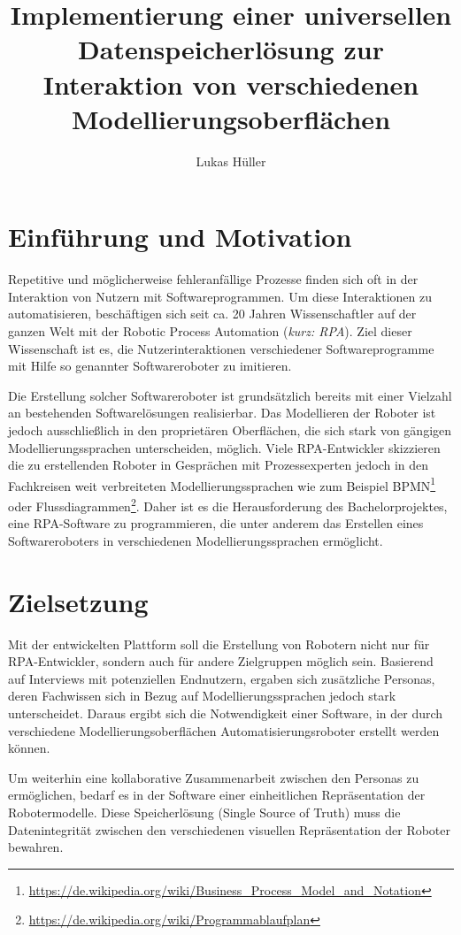 \documentclass[a4paper, ngerman ]{article}
\title{Implementierung einer universellen Datenspeicherlösung zur Interaktion von verschiedenen Modellierungsoberflächen}
\author{Lukas Hüller}
\newcommand{\ssot}{\glqq Single Source of Truth\grqq}
\begin{document}
\maketitle

\section{Einführung und Motivation}

Repetitive und möglicherweise fehleranfällige Prozesse finden sich oft in der Interaktion von Nutzern mit Softwareprogrammen. Um diese Interaktionen zu automatisieren, beschäftigen sich seit ca. 20 Jahren Wissenschaftler auf der ganzen Welt mit der \glqq Robotic Process Automation\grqq{} (\textit{kurz: RPA}). Ziel dieser Wissenschaft ist es, die Nutzerinteraktionen verschiedener Softwareprogramme mit Hilfe so genannter \glqq Softwareroboter\grqq{} zu imitieren.

Die Erstellung solcher Softwareroboter ist grundsätzlich bereits mit einer Vielzahl an bestehenden Softwarelösungen realisierbar. Das Modellieren der Roboter ist jedoch ausschließlich in den pro­p­ri­e­tären Oberflächen, die sich stark von gängigen Modellierungssprachen unterscheiden, möglich. Viele RPA-Entwickler skizzieren die zu erstellenden Roboter in Gesprächen mit Prozessexperten jedoch in den Fachkreisen weit verbreiteten Modellierungssprachen wie zum Beispiel BPMN\footnote{\url{https://de.wikipedia.org/wiki/Business_Process_Model_and_Notation}} oder Flussdiagrammen\footnote{\url{https://de.wikipedia.org/wiki/Programmablaufplan}}. Daher ist es die Herausforderung des Bachelorprojektes, eine RPA-Software zu programmieren, die unter anderem das Erstellen eines Softwareroboters in verschiedenen Modellierungssprachen ermöglicht. 

\section{Zielsetzung}

Mit der entwickelten Plattform soll die Erstellung von Robotern nicht nur für RPA-Entwickler, sondern auch für andere Zielgruppen möglich sein. Basierend auf Interviews mit potenziellen Endnutzern, ergaben sich zusätzliche Personas, deren Fachwissen sich in Bezug auf Modellierungssprachen jedoch stark unterscheidet. 
Daraus ergibt sich die Notwendigkeit einer Software, in der durch verschiedene Modellierungsoberflächen Automatisierungsroboter erstellt werden können. 

Um weiterhin eine kollaborative Zusammenarbeit zwischen den Personas zu ermöglichen, bedarf es in der Software einer einheitlichen Repräsentation der Robotermodelle. Diese Speicherlösung (\ssot) muss die Datenintegrität zwischen den verschiedenen visuellen Repräsentation der Roboter bewahren. 
\end{document}
